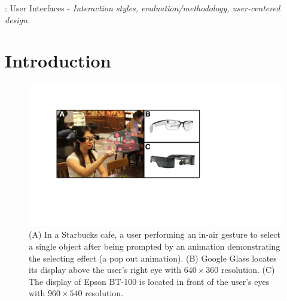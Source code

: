 \documentclass{sigchi}
\begin{document}
: User Interfaces - \emph{Interaction styles, evaluation/methodology, user-centered design.}



\section{Introduction}

 \begin{figure}[!h]
  \centering
  \includegraphics[width=1\columnwidth]{TopFigure.pdf}
  \caption{(A) In a Starbucks cafe, a user performing an in-air gesture to select a single object after being prompted by an animation demonstrating the selecting effect (a pop out animation). (B) Google Glass locates its display above the user’s right eye with $640 \times 360$ resolution. (C) The display of Epson BT-100 is located in front of the user’s eyes with $960 \times 540$ resolution.}
  \label{fig:TopFigure}
  \end{figure} 
\end{document}

